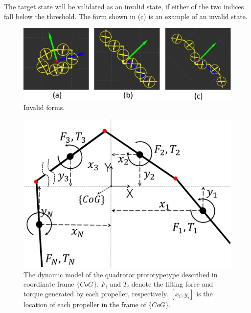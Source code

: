 \par
The target state will be validated as an invalid state, if either of the two indices fall below the threshold. The form shown in (c) is an example of an invalid state.

\begin{figure}[t]
  \begin{center}
    \includegraphics[width=1.0\columnwidth]{figs/invalid_forms.pdf}
  \end{center}
  \caption{Invalid forms.\label{figure:invalid_forms}}
\end{figure}

\begin{figure}[t]
  \begin{center}
    \includegraphics[width=0.9\columnwidth]{figs/dynamic_model.pdf}
    \caption{The dynamic model of the quadrotor prototypetype described in coordinate frame $\{CoG\}$. $F_i$ and $T_i$ denote the lifting force and torque generated by each propeller, respectively. $[x_i, y_i]$ is the location of each propeller in the frame of $\{CoG\}$.\label{figure:dynamic_model}}
  \end{center}
\end{figure}

